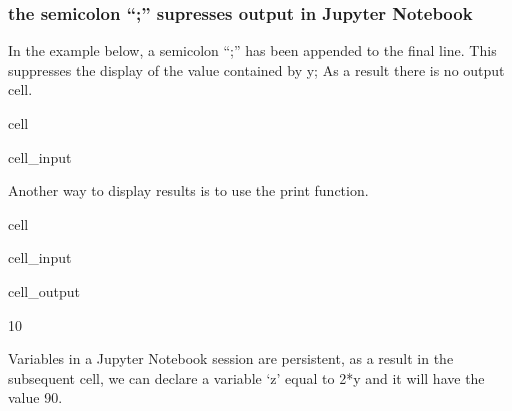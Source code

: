 \documentclass[letterpaper,10pt,english]{jupyterBook}
\begin{document}
\subsubsection{the semi\sphinxhyphen{}colon “;” supresses output in Jupyter Notebook}
\label{\detokenize{content/04_PythonEssentials/Intro_Jupyter_notebook:the-semi-colon-supresses-output-in-jupyter-notebook}}
\sphinxAtStartPar
In the example below, a semi\sphinxhyphen{}colon “;” has been appended to the final line.  This suppresses the display of the value contained by y;  As a result there is no output cell.

\begin{sphinxuseclass}{cell}\begin{sphinxVerbatimInput}

\begin{sphinxuseclass}{cell_input}
\begin{sphinxVerbatim}[commandchars=\\\{\}]
  
  
\end{sphinxVerbatim}

\end{sphinxuseclass}\end{sphinxVerbatimInput}

\end{sphinxuseclass}
\sphinxAtStartPar
Another way to display results is to use the print function.

\begin{sphinxuseclass}{cell}\begin{sphinxVerbatimInput}

\begin{sphinxuseclass}{cell_input}
\begin{sphinxVerbatim}[commandchars=\\\{\}]
  
\end{sphinxVerbatim}

\end{sphinxuseclass}\end{sphinxVerbatimInput}
\begin{sphinxVerbatimOutput}

\begin{sphinxuseclass}{cell_output}
\begin{sphinxVerbatim}[commandchars=\\\{\}]
10
\end{sphinxVerbatim}

\end{sphinxuseclass}\end{sphinxVerbatimOutput}

\end{sphinxuseclass}
\sphinxAtStartPar
Variables in a Jupyter Notebook session are persistent, as a result in the subsequent cell, we can declare a variable ‘z’ equal to 2*y and it will have the value 90.
\end{document}
